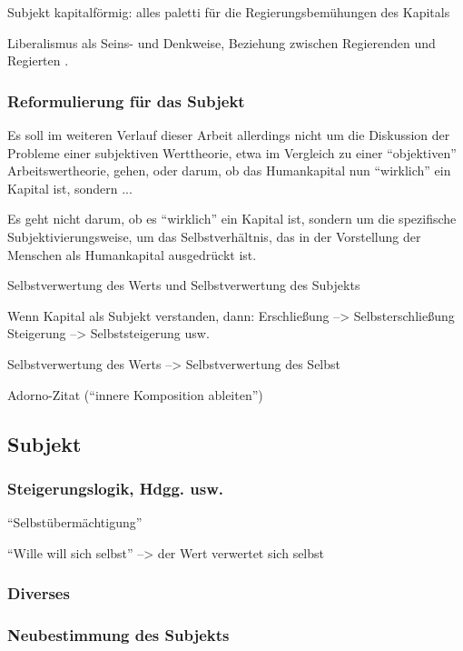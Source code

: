 \documentclass[12pt,
               DIV13,
               paper=a4,
               twoside=false,
               onehalfspacing,
               bibliography=totoc,
               toc=graduated,
               draft,
               ]{scrartcl}
\newcommand{\vgl}[2]{\parencite[vgl.][#1]{#2}}
\begin{document}
Subjekt kapitalförmig: alles paletti für die Regierungsbemühungen des
Kapitals

Liberalismus als Seins- und Denkweise, Beziehung zwischen Regierenden
und Regierten \vgl{305}{gbp}.

\subsubsection{Reformulierung für das Subjekt}

Es soll im weiteren Verlauf dieser Arbeit allerdings nicht um die
Diskussion der Probleme einer subjektiven Werttheorie, etwa im
Vergleich zu einer "`objektiven"' Arbeitswertheorie, gehen, oder
darum, ob das Humankapital nun "`wirklich"' ein Kapital ist, sondern
...

Es geht nicht darum, ob es "`wirklich"' ein Kapital ist, sondern um
die spezifische Subjektivierungsweise, um das Selbstverhältnis, das in
der Vorstellung der Menschen als Humankapital ausgedrückt ist.

Selbstverwertung des Werts und Selbstverwertung des Subjekts

Wenn Kapital als Subjekt verstanden, dann:
Erschließung --> Selbsterschließung
Steigerung --> Selbststeigerung usw.

Selbstverwertung des Werts --> Selbstverwertung des Selbst

Adorno-Zitat ("`innere Komposition ableiten"')


\subsection{Subjekt}

\subsubsection{Steigerungslogik, Hdgg. usw.}

"`Selbstübermächtigung"'

"`Wille will sich selbst"' --> der Wert verwertet sich selbst

\subsubsection{Diverses}

\subsubsection{Neubestimmung des Subjekts}
\end{document}
